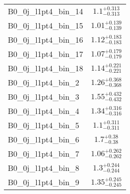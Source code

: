 \begin{tabular}{|l|c|}
B0\_0j\_l1pt4\_bin\_14 & $1.1^{+0.313}_{-0.313}$ \\
B0\_0j\_l1pt4\_bin\_15 & $1.01^{+0.139}_{-0.139}$ \\
B0\_0j\_l1pt4\_bin\_16 & $1.12^{+0.183}_{-0.183}$ \\
B0\_0j\_l1pt4\_bin\_17 & $1.07^{+0.179}_{-0.179}$ \\
B0\_0j\_l1pt4\_bin\_18 & $1.14^{+0.221}_{-0.221}$ \\
B0\_0j\_l1pt4\_bin\_2 & $1.26^{+0.368}_{-0.368}$ \\
B0\_0j\_l1pt4\_bin\_3 & $1.55^{+0.432}_{-0.432}$ \\
B0\_0j\_l1pt4\_bin\_4 & $1.34^{+0.316}_{-0.316}$ \\
B0\_0j\_l1pt4\_bin\_5 & $1.1^{+0.311}_{-0.311}$ \\
B0\_0j\_l1pt4\_bin\_6 & $1.7^{+0.38}_{-0.38}$ \\
B0\_0j\_l1pt4\_bin\_7 & $1.06^{+0.262}_{-0.262}$ \\
B0\_0j\_l1pt4\_bin\_8 & $1.3^{+0.244}_{-0.244}$ \\
B0\_0j\_l1pt4\_bin\_9 & $1.35^{+0.245}_{-0.245}$ \\
\hline
\end{tabular}
